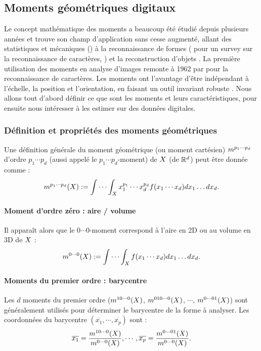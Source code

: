 \subsection{Moments géométriques digitaux}
%
Le concept mathématique des moments a beaucoup été étudié depuis plusieurs
années et trouve son champ d'application sans cesse augmenté, allant des
statistiques et mécaniques () \cite{} à la
reconnaissance de formes ( pour un survey sur la
reconnaissance de caractères, \cite{}) et la reconstruction d'objets \cite{Ghorbel2005}.
La première utilisation des moments en analyse d'images remonte à 1962 par
 pour la reconnaissance de caractères.
%
Les moments ont l'avantage d'être indépendant à l'échelle, la position et
l'orientation, en faisant un outil invariant robuste \cite{}. Nous allons tout
d'abord définir ce que sont les moments et leurs caractéristiques, pour ensuite
nous intéresser à les estimer sur des données digitales.
%
%
\subsubsection{Définition et propriétés des moments géométriques}
%
Une définition générale du moment géométrique (ou moment cartésien) $m^{p_1
\cdots p_d}$ d'ordre $p_1 \cdots p_d$ (aussi appelé le $p_1 \cdots p_d$-moment)
de $X$ (de $\mathbb{R}^d$) peut être donnée comme :
%
\begin{equation}
  m^{p_1 \cdots p_d}(X) := \idotsint_{X} x_1^{p_1} \cdots x_d^{p_d} f(x_1 \cdots x_d) dx_1 \ldots dx_d.
\end{equation}
%
\paragraph{Moment d'ordre zéro : aire / volume}
%
Il apparaît alors que le $0\cdots0$-moment correspond à l'aire en 2D ou au
volume en 3D de $X$ :
%
\begin{equation}
  m^{0 \cdots 0}(X) := \idotsint_{X} f(x_1 \cdots x_d) dx_1 \ldots dx_d.
\end{equation}
%
\paragraph{Moments du premier ordre : barycentre}
%
Les $d$ moments du premier ordre ($m^{1 0 \cdots 0}(X)$, $m^{0 1 0
\cdots 0}(X)$, $\cdots$, $m^{0 \cdots 0 1}(X)$) sont généralement
utilisés pour déterminer le barycentre de la forme à analyser. Les coordonnées
du barycentre $(\overline{x_1}, \cdots, \overline{x_p})$ sont :
%
\begin{equation}
  \overline{x_1} = \frac{m^{1 0 \cdots 0}(X)}{m^{0 \cdots 0}(X)}, \cdots, \overline{x_p} = \frac{m^{0 \cdots 0 1}(X)}{m^{0 \cdots 0}(X)}.
\end{equation}
%
